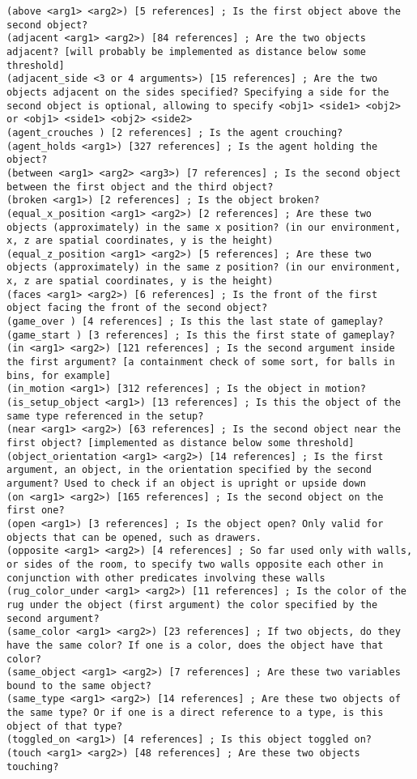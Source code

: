 \documentclass{article}
\begin{document}
\begin{lstlisting}
(above <arg1> <arg2>) [5 references] ; Is the first object above the second object?
(adjacent <arg1> <arg2>) [84 references] ; Are the two objects adjacent? [will probably be implemented as distance below some threshold]
(adjacent_side <3 or 4 arguments>) [15 references] ; Are the two objects adjacent on the sides specified? Specifying a side for the second object is optional, allowing to specify <obj1> <side1> <obj2> or <obj1> <side1> <obj2> <side2>
(agent_crouches ) [2 references] ; Is the agent crouching?
(agent_holds <arg1>) [327 references] ; Is the agent holding the object?
(between <arg1> <arg2> <arg3>) [7 references] ; Is the second object between the first object and the third object?
(broken <arg1>) [2 references] ; Is the object broken?
(equal_x_position <arg1> <arg2>) [2 references] ; Are these two objects (approximately) in the same x position? (in our environment, x, z are spatial coordinates, y is the height)
(equal_z_position <arg1> <arg2>) [5 references] ; Are these two objects (approximately) in the same z position? (in our environment, x, z are spatial coordinates, y is the height)
(faces <arg1> <arg2>) [6 references] ; Is the front of the first object facing the front of the second object?
(game_over ) [4 references] ; Is this the last state of gameplay?
(game_start ) [3 references] ; Is this the first state of gameplay?
(in <arg1> <arg2>) [121 references] ; Is the second argument inside the first argument? [a containment check of some sort, for balls in bins, for example]
(in_motion <arg1>) [312 references] ; Is the object in motion?
(is_setup_object <arg1>) [13 references] ; Is this the object of the same type referenced in the setup?
(near <arg1> <arg2>) [63 references] ; Is the second object near the first object? [implemented as distance below some threshold]
(object_orientation <arg1> <arg2>) [14 references] ; Is the first argument, an object, in the orientation specified by the second argument? Used to check if an object is upright or upside down
(on <arg1> <arg2>) [165 references] ; Is the second object on the first one?
(open <arg1>) [3 references] ; Is the object open? Only valid for objects that can be opened, such as drawers.
(opposite <arg1> <arg2>) [4 references] ; So far used only with walls, or sides of the room, to specify two walls opposite each other in conjunction with other predicates involving these walls
(rug_color_under <arg1> <arg2>) [11 references] ; Is the color of the rug under the object (first argument) the color specified by the second argument?
(same_color <arg1> <arg2>) [23 references] ; If two objects, do they have the same color? If one is a color, does the object have that color?
(same_object <arg1> <arg2>) [7 references] ; Are these two variables bound to the same object?
(same_type <arg1> <arg2>) [14 references] ; Are these two objects of the same type? Or if one is a direct reference to a type, is this object of that type?
(toggled_on <arg1>) [4 references] ; Is this object toggled on?
(touch <arg1> <arg2>) [48 references] ; Are these two objects touching?
\end{lstlisting}
\end{document}
